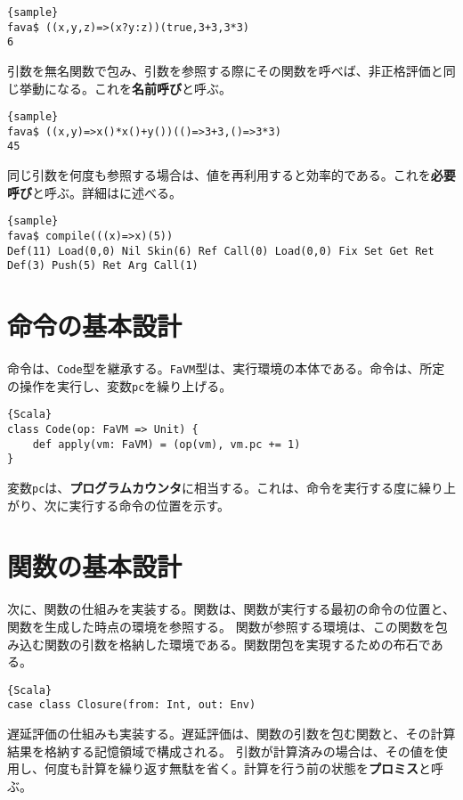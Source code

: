 \documentclass[10pt,a4paper]{book}
\begin{document}
\begin{Verbatim}{sample}
fava$ ((x,y,z)=>(x?y:z))(true,3+3,3*3)
6
\end{Verbatim}

引数を無名関数で包み、引数を参照する際にその関数を呼べば、非正格評価と同じ挙動になる。これを\textbf{名前呼び}と呼ぶ。

\begin{Verbatim}{sample}
fava$ ((x,y)=>x()*x()+y())(()=>3+3,()=>3*3)
45
\end{Verbatim}

同じ引数を何度も参照する場合は、値を再利用すると効率的である。これを\textbf{必要呼び}と呼ぶ。詳細はに述べる。

\begin{Verbatim}{sample}
fava$ compile(((x)=>x)(5))
Def(11) Load(0,0) Nil Skin(6) Ref Call(0) Load(0,0) Fix Set Get Ret Def(3) Push(5) Ret Arg Call(1)
\end{Verbatim}

\section{命令の基本設計}

命令は、\texttt{Code}型を継承する。\texttt{FaVM}型は、実行環境の本体である。命令は、所定の操作を実行し、変数\texttt{pc}を繰り上げる。

\begin{Verbatim}{Scala}
class Code(op: FaVM => Unit) {
	def apply(vm: FaVM) = (op(vm), vm.pc += 1)
}
\end{Verbatim}

変数\texttt{pc}は、\textbf{プログラムカウンタ}に相当する。これは、命令を実行する度に繰り上がり、次に実行する命令の位置を示す。

\section{関数の基本設計\label{sect:func}}

次に、関数の仕組みを実装する。関数は、関数が実行する最初の命令の位置と、関数を生成した時点の環境を参照する。
関数が参照する環境は、この関数を包み込む関数の引数を格納した環境である。関数閉包を実現するための布石である。

\begin{Verbatim}{Scala}
case class Closure(from: Int, out: Env)
\end{Verbatim}

遅延評価の仕組みも実装する。遅延評価は、関数の引数を包む関数と、その計算結果を格納する記憶領域で構成される。
引数が計算済みの場合は、その値を使用し、何度も計算を繰り返す無駄を省く。計算を行う前の状態を\textbf{プロミス}と呼ぶ。
\end{document}
